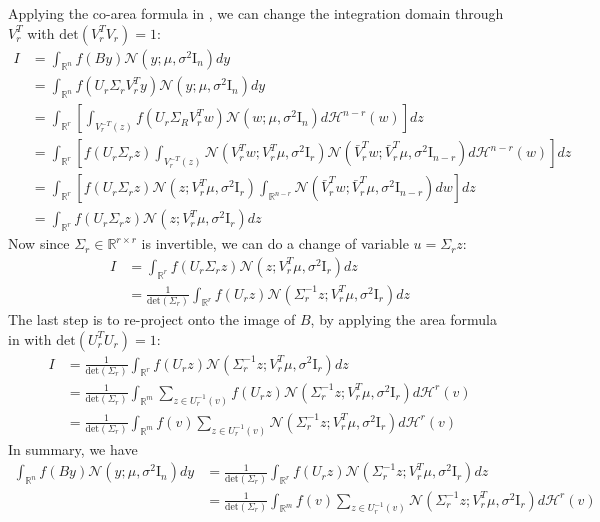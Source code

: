 \documentclass[a4paper,10pt]{article}
\theoremstyle{definition} %
\theoremstyle{definition} %
\theoremstyle{definition} %
\theoremstyle{definition} %
\newcommand{\R}{\mathbb{R}}
\newcommand{\Normal}[1]{\mathcal{N}\left( {#1} \right)}
\newcommand{\Id}{\mathrm{I}}
\newcommand{\0}{\boldsymbol{0}}
\renewcommand{\H}{\mathcal{H}}
\renewcommand{\det}[1]{\mathrm{det}\left( #1 \right)}
\begin{document}
Applying the co-area formula in , we can change the integration domain through $V_r^T$ with $\det{V_r^T V_r} = 1$: 
\begin{align*}
    I &= \int_{\R^n} f(B y) \Normal{y; \mu, \sigma^2 \Id_n} dy 
    \\&= \int_{\R^n} f(U_r \Sigma_r V_r^T y) \Normal{y; \mu, \sigma^2 \Id_n} dy 
    \\&= \int_{\R^r} \left[ \int_{V_r^{-T}(z)} f(U_r \Sigma_R V_r^T w) \Normal{w; \mu, \sigma^2 \Id_n} d\H^{n - r}(w)\right] dz
    \\&= \int_{\R^r} \left[ f(U_r \Sigma_r z) \int_{V_r^{-T}(z)} \Normal{V_r^T w; V_r^T \mu, \sigma^2 \Id_r} \Normal{\bar{V}_r^T w; \bar{V}_r^T \mu, \sigma^2 \Id_{n-r}} d \H^{n - r}(w)\right] dz
    \\&= \int_{\R^r} \left[ f(U_r \Sigma_r z) \Normal{z; V_r^T \mu, \sigma^2 \Id_r} \int_{\R^{n - r}}  \Normal{\bar{V}_r^T w; \bar{V}_r^T \mu, \sigma^2 \Id_{n-r}} dw \right] dz
    \\&= \int_{\R^r}f(U_r \Sigma_r z) \Normal{z; V_r^T \mu, \sigma^2 \Id_r} dz
\end{align*}
Now since $\Sigma_r \in \R^{r \times r}$ is invertible, we can do a change of variable $u = \Sigma_r z$: 
\begin{align*}
    I &= \int_{\R^r}f(U_r \Sigma_r z) \Normal{z; V_r^T \mu, \sigma^2 \Id_r} dz
    \\&= \frac{1}{\det{\Sigma_r}} \int_{\R^r}f(U_r z) \Normal{\Sigma_r^{-1} z; V_r^T \mu, \sigma^2 \Id_r} dz
\end{align*}
The last step is to re-project onto the image of $B$, by applying the area formula in  with $\det{U_r^T U_r} = 1$: 
\begin{align*}
    I &= \frac{1}{\det{\Sigma_r}} \int_{\R^r} f(U_r z) \Normal{\Sigma_r^{-1} z; V_r^T \mu, \sigma^2 \Id_r} dz
    \\&=  \frac{1}{\det{\Sigma_r}} \int_{\R^{m}} \sum_{z \in U_r^{-1}(v) } f(U_r z) \Normal{\Sigma_r^{-1} z; V_r^T \mu, \sigma^2 \Id_r} d \H^{r}(v)
    \\&=  \frac{1}{\det{\Sigma_r}} \int_{\R^{m}} f(v) \sum_{z \in U_r^{-1}(v) } \Normal{\Sigma_r^{-1} z; V_r^T \mu, \sigma^2 \Id_r} d \H^{r}(v)
\end{align*}
In summary, we have 
    \begin{align}\label{eq:key_equation}
        \int_{\R^n} f(B y) \Normal{y; \mu, \sigma^2 \Id_n} dy 
        &= \frac{1}{\det{\Sigma_r}} \int_{\R^r}f(U_r z) \Normal{\Sigma_r^{-1} z; V_r^T \mu, \sigma^2 \Id_r} dz
        \\&= \frac{1}{\det{\Sigma_r}} \int_{\R^{m}} f(v) \sum_{z \in U_r^{-1}(v) } \Normal{\Sigma_r^{-1} z; V_r^T \mu, \sigma^2 \Id_r} d \H^{r}(v)
    \end{align}
\end{document}

